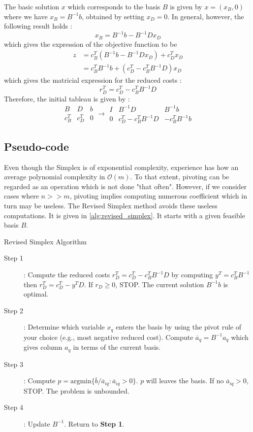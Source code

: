 The basic solution $x$ which corresponds to the basis $B$ is given by $x = (x_B, 0)$ where we have $x_B = B^{-1}b$, obtained by setting $x_D = 0$. In general, however, the following result holds : 
\[ x_B = B^{-1}b - B^{-1}Dx_D \] which gives the expression of the objective function to be
\begin{align*}
    z &= c^T_B(B^{-1}b - B^{-1}Dx_D) + c_D^Tx_D\\
    &= c^T_BB^{-1}b + ( c_D^T - c_B^TB^{-1}D )x_D
\end{align*}
which gives the matricial expression for the reduced costs : \[ r_D^T = c_D^T - c_B^TB^{-1}D \]
Therefore, the initial tableau is given by : 
\[
    \begin{array}{cc|c}
        B & D & b\\\hline
        c^T_B & c^T_D & 0
    \end{array} \longrightarrow
    \begin{array}{cc|c}
        I & B^{-1}D & B^{-1}b\\\hline
        0 & c^T_D - c^T_BB^{-1}D & -c_B^TB^{-1}b
    \end{array}
\]

\subsection{Pseudo-code}

Even though the Simplex is of exponential complexity, experience has how an average polynomial complexity in $\mathcal O(m)$. To that extent, pivoting can be regarded as an operation which is not done "that often". However, if we consider cases where $n >> m$, pivoting implies computing numerous coefficient which in turn may be useless. The Revised Simplex method avoids these useless computations. It is given in \ref{alg:revised_simplex}. It starts with a given feasible basis $B$. 

\begin{algorithm}[h!]
    \caption{Revised Simplex Algorithm}
    \label{alg:revised_simplex}
    \begin{description}
        \item[Step 1] : Compute the reduced costs $r_D^T = c^T_D - c_B^TB^{-1}D$ by computing $y^T = c_B^TB^{-1}$ then $r_D^T = c_D^T - y^TD$. If $r_D\ge 0$, STOP. The current solution $B^{-1}b$ is optimal.
        \item[Step 2] : Determine which variable $x_q$ enters the basis by using the pivot rule of your choice (e.g., most negative reduced cost). Compute $\overline a_q = B^{-1}a_q$ which gives column $a_q$ in terms of the current basis.
        \item[Step 3] : Compute $p = \textrm{argmin}\{ \overline b / \overline a_{iq} : \overline a_{iq} > 0 \}$. $p$ will leaves the basis. If no $\overline a_{iq} > 0$, STOP. The problem is unbounded. 
        \item[Step 4] : Update $B^{-1}$. Return to \textbf{Step 1}. 
    \end{description}
\end{algorithm}

